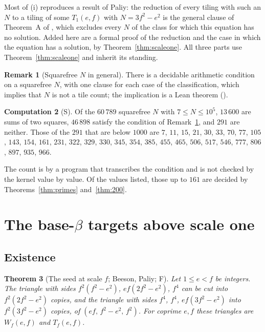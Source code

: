 \documentclass[11pt,reqno]{amsart}
\theoremstyle{plain}
\newtheorem{theorem}{Theorem}[section]
\theoremstyle{definition}
\newtheorem{remark}[theorem]{Remark}
\newtheorem{computation}[theorem]{Computation}
\newcommand{\sF}{\textup{\textsf{F}}}
\newcommand{\sS}{\textup{\textsf{S}}}
\begin{document}
Most of (i) reproduces a result of Paliy: the reduction of every tiling with such an $N$ to a tiling of some
$T_1(e,f)$ with $N=3f^2-e^2$ is the general clause of Theorem~A of \cite{PaliyReduction}, which excludes
every $N$ of the class for which this equation has no solution. Added here are a formal proof of the
reduction and the case in which the equation has a solution, by Theorem~\ref{thm:scaleone}. All three parts
use Theorem~\ref{thm:scaleone} and inherit its standing.

\begin{remark}[Squarefree $N$ in general]\label{rem:c3}
There is a decidable arithmetic condition on a squarefree $N$, with one clause for each case of the
classification, which implies that $N$ is not a tile count; the implication is a Lean theorem
().
\end{remark}

\begin{computation}[\sS]\label{comp:c3}
Of the $60\,789$ squarefree $N$ with $7\le N\le10^5$, $13\,600$ are sums of two squares, $46\,898$ satisfy
the condition of Remark~\ref{rem:c3}, and $291$ are neither. Those of the $291$ that are below $1000$ are
$7$, $11$, $15$, $21$, $30$, $33$, $70$, $77$, $105$, $143$, $154$, $161$, $231$, $322$, $329$, $330$,
$345$, $354$, $385$, $455$, $465$, $506$, $517$, $546$, $777$, $806$, $897$, $935$, $966$.
\end{computation}

The count is by a program that transcribes the condition and is not checked by the kernel value by value.
Of the values listed, those up to $161$ are decided by Theorems~\ref{thm:primes} and~\ref{thm:200}.

\section{The base-$\beta$ targets above scale one}\label{sec:row}

\subsection{Existence}

\begin{theorem}[The seed at scale $f$; Beeson, Paliy; \sF]\label{thm:seed}
Let $1\le e<f$ be integers. The triangle with sides $f^2(f^2-e^2)$, $ef(2f^2-e^2)$, $f^4$ can be cut into
$f^2(2f^2-e^2)$ copies, and the triangle with sides $f^4$, $f^4$, $ef(3f^2-e^2)$ into $f^2(3f^2-e^2)$ copies,
of $(ef,\,f^2-e^2,\,f^2)$. For coprime $e,f$ these triangles are $W_f(e,f)$ and $T_f(e,f)$.
\end{theorem}
\end{document}
